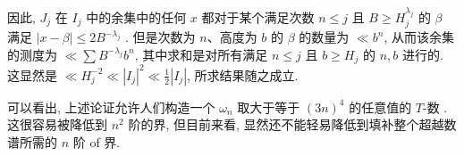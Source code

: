 因此, $J_j$ 在 $I_j$ 中的余集中的任何 $x$ 都对于某个满足次数 $n \le j$ 且 $B \ge H_j^{\lambda_j}$ 的 $\beta$ 满足 $|x-\beta| \le 2B^{-\lambda_j}$ . 但是次数为 $n$、高度为 $b$ 的 $\beta$ 的数量为 $\ll b^n$, 从而该余集的测度为 $\ll \sum B^{-\lambda_j}b^n$, 其中求和是对所有满足 $n \le j$ 且 $b \ge H_j$ 的 $n, b$ 进行的. 这显然是 $\ll H_j^{-2} \ll |I_j|^2 \ll \frac{1}{2}|I_j|$, 所求结果随之成立.

可以看出, 上述论证允许人们构造一个 $\omega_n$ 取大于等于 $(3n)^4$ 的任意值的 $T$-数 . 这很容易被降低到 $n^2$ 阶的界, 但目前来看, 显然还不能轻易降低到填补整个超越数谱所需的 $n$ 阶 of 界.
